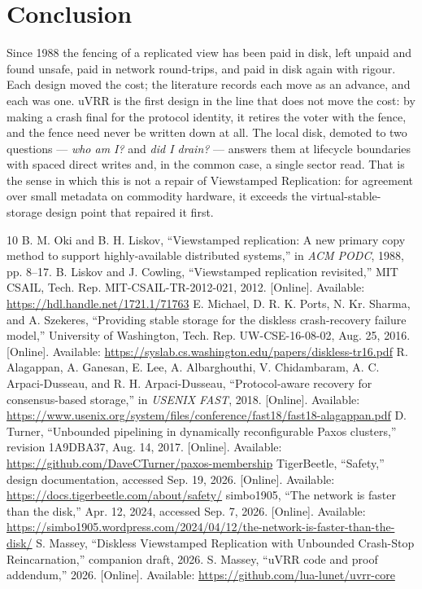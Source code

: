 \documentclass[10pt,journal,letterpaper]{IEEEtran}
\begin{document}
\section{Conclusion}\label{sec:conclusion}
Since 1988 the fencing of a replicated view has been paid in disk, left
unpaid and found unsafe, paid in network round-trips, and paid in disk again
with rigour.
Each design moved the cost; the literature records each move as an advance,
and each was one.
uVRR is the first design in the line that does not move the cost: by making a
crash final for the protocol identity, it retires the voter with the fence,
and the fence need never be written down at all.
The local disk, demoted to two questions --- \emph{who am I?} and \emph{did
I drain?} --- answers them at lifecycle boundaries with spaced direct writes
and, in the common case, a single sector read.
That is the sense in which this is not a repair of Viewstamped Replication:
for agreement over small metadata on commodity hardware, it exceeds the
virtual-stable-storage design point that repaired it first.

\begin{thebibliography}{10}
 B. M. Oki and B. H. Liskov, ``Viewstamped replication: A new primary copy method to support highly-available distributed systems,'' in \emph{ACM PODC}, 1988, pp. 8--17.
 B. Liskov and J. Cowling, ``Viewstamped replication revisited,'' MIT CSAIL, Tech. Rep. MIT-CSAIL-TR-2012-021, 2012. [Online]. Available: \url{https://hdl.handle.net/1721.1/71763}
 E. Michael, D. R. K. Ports, N. Kr. Sharma, and A. Szekeres, ``Providing stable storage for the diskless crash-recovery failure model,'' University of Washington, Tech. Rep. UW-CSE-16-08-02, Aug. 25, 2016. [Online]. Available: \url{https://syslab.cs.washington.edu/papers/diskless-tr16.pdf}
 R. Alagappan, A. Ganesan, E. Lee, A. Albarghouthi, V. Chidambaram, A. C. Arpaci-Dusseau, and R. H. Arpaci-Dusseau, ``Protocol-aware recovery for consensus-based storage,'' in \emph{USENIX FAST}, 2018. [Online]. Available: \url{https://www.usenix.org/system/files/conference/fast18/fast18-alagappan.pdf}
 D. Turner, ``Unbounded pipelining in dynamically reconfigurable Paxos clusters,'' revision 1A9DBA37, Aug. 14, 2017. [Online]. Available: \url{https://github.com/DaveCTurner/paxos-membership}
 TigerBeetle, ``Safety,'' design documentation, accessed Sep. 19, 2026. [Online]. Available: \url{https://docs.tigerbeetle.com/about/safety/}
 simbo1905, ``The network is faster than the disk,'' Apr. 12, 2024, accessed Sep. 7, 2026. [Online]. Available: \url{https://simbo1905.wordpress.com/2024/04/12/the-network-is-faster-than-the-disk/}
 S. Massey, ``Diskless Viewstamped Replication with Unbounded Crash-Stop Reincarnation,'' companion draft, 2026.
 S. Massey, ``uVRR code and proof addendum,'' 2026. [Online]. Available: \url{https://github.com/lua-lunet/uvrr-core}
\end{thebibliography}
\end{document}
